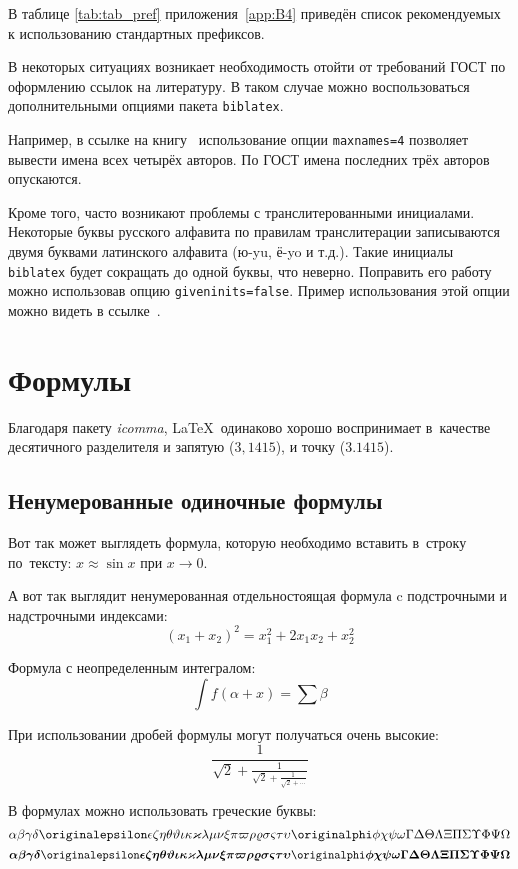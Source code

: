 В таблице \cref{tab:tab_pref} приложения~\cref{app:B4} приведён список рекомендуемых
к использованию стандартных префиксов.

В некоторых ситуациях возникает необходимость отойти от требований ГОСТ по оформлению ссылок на
литературу.
В таком случае можно воспользоваться дополнительными опциями пакета \verb+biblatex+.

Например, в ссылке на книгу~\cite{sobenin_kdv} использование опции \verb+maxnames=4+ позволяет
вывести имена всех четырёх авторов.
По ГОСТ имена последних трёх авторов опускаются.

Кроме того, часто возникают проблемы с транслитерованными инициалами. Некоторые буквы русского
алфавита по правилам транслитерации записываются двумя буквами латинского алфавита (ю-yu, ё-yo и
т.д.).
Такие инициалы \verb+biblatex+ будет сокращать до одной буквы, что неверно.
Поправить его работу можно использовав опцию \verb+giveninits=false+.
Пример использования этой опции можно видеть в ссылке~\cite{initials}.

\section{Формулы}\label{sec:ch1/sec4}

Благодаря пакету \textit{icomma}, \LaTeX~одинаково хорошо воспринимает
в~качестве десятичного разделителя и запятую (\(3,1415\)), и точку (\(3.1415\)).

\subsection{Ненумерованные одиночные формулы}\label{subsec:ch1/sec3/sub1}

Вот так может выглядеть формула, которую необходимо вставить в~строку
по~тексту: \(x \approx \sin x\) при \(x \to 0\).

А вот так выглядит ненумерованная отдельностоящая формула c подстрочными
и надстрочными индексами:
\[
    (x_1+x_2)^2 = x_1^2 + 2 x_1 x_2 + x_2^2
\]

Формула с неопределенным интегралом:
\[
    \int f(\alpha+x)=\sum\beta
\]

При использовании дробей формулы могут получаться очень высокие:
\[
    \frac{1}{\sqrt{2}+
        \displaystyle\frac{1}{\sqrt{2}+
            \displaystyle\frac{1}{\sqrt{2}+\cdots}}}
\]

В формулах можно использовать греческие буквы:
\[
    \alpha\beta\gamma\delta\originalepsilon\epsilon\zeta\eta\theta%
    \vartheta\iota\kappa\varkappa\lambda\mu\nu\xi\pi\varpi\rho\varrho%
    \sigma\varsigma\tau\upsilon\originalphi\phi\chi\psi\omega\Gamma\Delta%
    \Theta\Lambda\Xi\Pi\Sigma\Upsilon\Phi\Psi\Omega
\]
\[%
    \boldsymbol{\alpha\beta\gamma\delta\originalepsilon\epsilon\zeta\eta%
        \theta\vartheta\iota\kappa\varkappa\lambda\mu\nu\xi\pi\varpi\rho%
        \varrho\sigma\varsigma\tau\upsilon\originalphi\phi\chi\psi\omega\Gamma%
        \Delta\Theta\Lambda\Xi\Pi\Sigma\Upsilon\Phi\Psi\Omega}
\]

